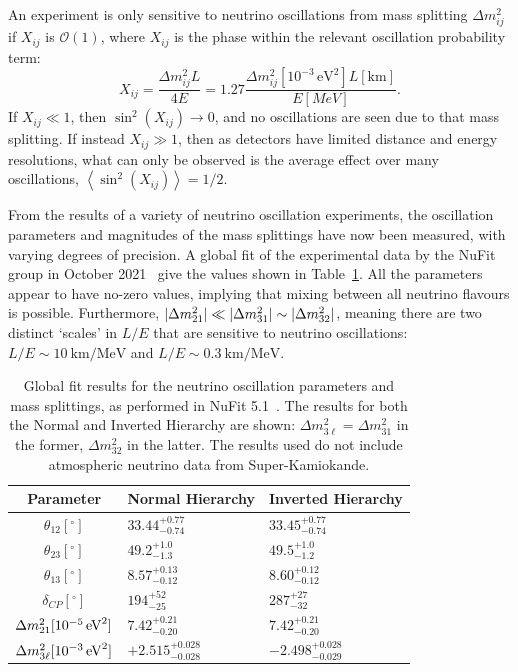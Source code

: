 An experiment is only sensitive to neutrino oscillations from mass splitting $\Delta m^{2}_{ij}$ if $X_{ij}$ is $\mathcal{O}(1)$, where $X_{ij}$ is the phase within the relevant oscillation probability term:
\begin{equation}\label{eq:nu_osc_phase}
    X_{ij} = \frac{\Delta m^{2}_{ij} L}{4E} = 1.27 \frac{\Delta m^{2}_{ij} [10^{-3}\,\si{\eV\squared}] L [\si{\km}]}{E [\si{MeV}]}.
\end{equation}
If $X_{ij}\ll 1$, then $\sin^{2}\left(X_{ij}\right)\to 0$, and no oscillations are seen due to that mass splitting. If instead $X_{ij}\gg 1$, then as detectors have limited distance and energy resolutions, what can only be observed is the average effect over many oscillations, $\left<\sin^{2}\left(X_{ij}\right)\right> = 1/2$.

From the results of a variety of neutrino oscillation experiments, the oscillation parameters and magnitudes of the mass splittings have now been measured, with varying degrees of precision. A global fit of the experimental data by the NuFit group in October 2021~\cite{estebanFateHintsUpdated2020} give the values shown in Table~\ref{tab:nufit_osc_params}. All the parameters appear to have no-zero values, implying that mixing between all neutrino flavours is possible. Furthermore, $|\dmsq{}|\ll|\Delta m^{2}_{31}|\sim|\Delta m^{2}_{32}|$, meaning there are two distinct `scales' in $L/E$ that are sensitive to neutrino oscillations: $L/E\sim\SI{10}{\km\per\MeV}$ and $L/E\sim\SI{0.3}{\km\per\MeV}.$

\begin{table}
    \centering
    \begin{tabular}{c p{2.2cm} p{2.2cm}}
        \hline
        Parameter   & Normal Hierarchy                       & Inverted Hierarchy  \\ \hline \hline
        $\theta_{12} [^{\circ}]$ & $33.44^{+0.77}_{-0.74}$  & $33.45^{+0.77}_{-0.74}$     \\
        $\theta_{23} [^{\circ}]$ & $49.2^{+1.0}_{-1.3}$     & $49.5^{+1.0}_{-1.2}$  \\
        $\theta_{13} [^{\circ}]$ & $8.57^{+0.13}_{-0.12}$   & $8.60^{+0.12}_{-0.12}$  \\
        $\delta_{CP} [^{\circ}]$ & $194^{+52}_{-25}$        & $287^{+27}_{-32}$   \\
        $\dmsq{} [10^{-5}\,\si{eV\squared}]$ & $7.42^{+0.21}_{-0.20}$ & $7.42^{+0.21}_{-0.20}$    \\
        $\Delta m^{2}_{3\ell} [10^{-3}\,\si{eV\squared}]$ & $+2.515^{+0.028}_{-0.028}$ & $-2.498^{+0.028}_{-0.029}$    \\
        \hline
    \end{tabular}
    \caption[Global Fit neutrino oscillation parameters]
    {Global fit results for the neutrino oscillation parameters and mass splittings, as performed in NuFit 5.1~\cite{estebanFateHintsUpdated2020}. The results for both the Normal and Inverted Hierarchy are shown: $\Delta m^{2}_{3\ell} = \Delta m^{2}_{31}$ in the former, $\Delta m^{2}_{32}$ in the latter. The results used do not include atmospheric neutrino data from Super-Kamiokande.}
    \label{tab:nufit_osc_params}
\end{table}

